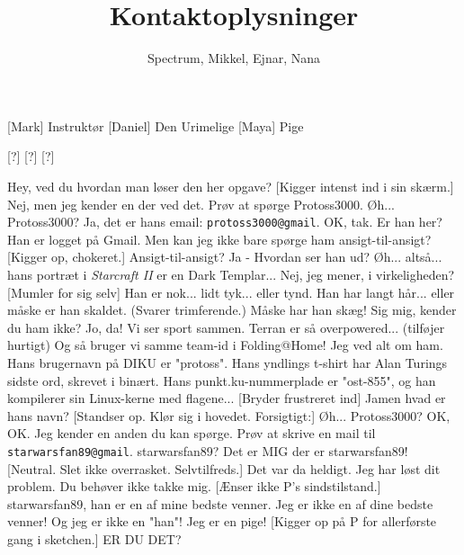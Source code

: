 \documentclass[a4paper,11pt]{article}
\title{Kontaktoplysninger}
\author{Spectrum, Mikkel, Ejnar, Nana}
\begin{document}
\maketitle

\begin{roles}
 [Mark] Instruktør
  [Daniel] Den Urimelige
  [Maya] Pige
\end{roles}

\begin{props}
  [?]
  [?]
  [?]
\end{props}

\begin{sketch}
   Hey, ved du hvordan man løser den her opgave?
   [Kigger intenst ind i sin skærm.] 
  Nej, men jeg kender en der ved det. Prøv at spørge Protoss3000.
   Øh... Protoss3000?
   Ja, det er hans email: \texttt{protoss3000@gmail}.
   OK, tak. Er han her?
   Han er logget på Gmail.
   Men kan jeg ikke bare spørge ham ansigt-til-ansigt?
  [Kigger op, chokeret.] Ansigt-til-ansigt?
   Ja - Hvordan ser han ud?
   Øh... altså... hans portræt i \emph{Starcraft II} er en Dark Templar...
   Nej, jeg mener, i virkeligheden?
   [Mumler for sig selv]
  Han er nok... lidt tyk... eller tynd. Han har langt hår... eller måske er han skaldet. 
  (Svarer trimferende.) 
  Måske har han skæg!
   Sig mig, kender du ham ikke?
  Jo, da! Vi ser sport sammen. Terran er så overpowered... (tilføjer hurtigt) Og så bruger vi samme team-id i Folding@Home!
  Jeg ved alt om ham. 
  Hans brugernavn på DIKU er "protoss". 
  Hans yndlings t-shirt har Alan Turings sidste ord, skrevet i binært. 
  Hans punkt.ku-nummerplade er "ost-855", og han kompilerer sin Linux-kerne med flagene...
  [Bryder frustreret ind]
  Jamen hvad er hans navn?
  [Standser op. Klør sig i hovedet. Forsigtigt:] 
  Øh... Protoss3000?
  OK, OK. Jeg kender en anden du kan spørge. 
  Prøv at skrive en mail til \texttt{starwarsfan89@gmail}.
   starwarsfan89? Det er MIG der er starwarsfan89!
  [Neutral. Slet ikke overrasket. Selvtilfreds.] 
  Det var da heldigt. Jeg har løst dit problem. Du behøver ikke takke mig.
  [Ænser ikke P's sindstilstand.] 
  starwarsfan89, han er en af mine bedste venner.
  Jeg er ikke en af dine bedste venner! 
  Og jeg er ikke en "han"! 
  Jeg er en pige!
  [Kigger op på P for allerførste gang i sketchen.] 
  ER DU DET? 
\end{sketch}
\end{document}
